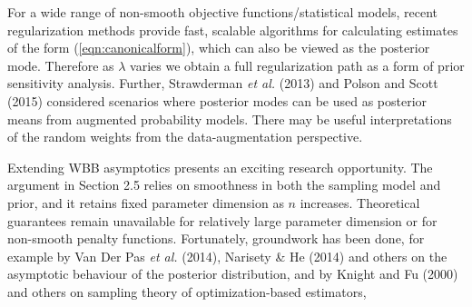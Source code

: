 \documentclass[12pt]{TD-CJS}
\begin{document}
For a wide range of non-smooth objective functions/statistical models, recent regularization methods provide fast, scalable algorithms for calculating estimates of the form (\ref{eqn:canonicalform}), which can also be viewed as the posterior mode. Therefore as $\lambda$ varies we obtain a full regularization path as a form of prior sensitivity analysis. Further, Strawderman {\em et al.} (2013) and Polson and Scott (2015) 
considered scenarios where posterior modes can be used as posterior means from augmented probability models.
There may be useful interpretations of the random weights from the data-augmentation perspective.


Extending WBB asymptotics presents an exciting research opportunity.   
The argument in Section 2.5 
relies on smoothness in both the sampling model and prior, and it retains fixed parameter
dimension as $n$ increases.  Theoretical guarantees remain unavailable for relatively large parameter
dimension or for non-smooth penalty functions.  Fortunately, groundwork has been done, for example by 
Van Der Pas {\em et al.} (2014), Narisety \&  He  (2014) and others on the asymptotic  behaviour of the 
posterior distribution,  and by Knight and Fu (2000) and others on sampling theory of 
optimization-based estimators,



\end{document}
